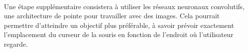 \paragraph{}
Une étape supplémentaire consistera à utiliser les réseaux neuronaux convolutifs, une architecture de pointe pour travailler avec des images.
Cela pourrait permettre d'atteindre un objectif plus préférable, à savoir prévoir exactement l'emplacement du curseur de la souris en fonction de l'endroit où l'utilisateur regarde.

